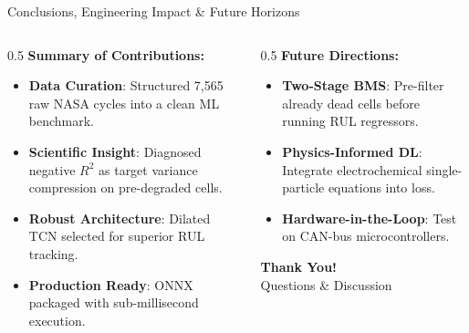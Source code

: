 \documentclass[aspectratio=169, 10pt]{beamer}
\begin{document}
\begin{frame}{Conclusions, Engineering Impact \& Future Horizons}
\begin{columns}[T]
    \begin{column}{0.5\textwidth}
        \textbf{Summary of Contributions:}
        \begin{itemize}
            \item \textbf{Data Curation}: Structured 7,565 raw NASA cycles into a clean ML benchmark.
            \item \textbf{Scientific Insight}: Diagnosed negative $R^2$ as target variance compression on pre-degraded cells.
            \item \textbf{Robust Architecture}: Dilated TCN selected for superior RUL tracking.
            \item \textbf{Production Ready}: ONNX packaged with sub-millisecond execution.
        \end{itemize}
    \end{column}
    \begin{column}{0.5\textwidth}
        \textbf{Future Directions:}
        \begin{itemize}
            \item \textbf{Two-Stage BMS}: Pre-filter already dead cells before running RUL regressors.
            \item \textbf{Physics-Informed DL}: Integrate electrochemical single-particle equations into loss.
            \item \textbf{Hardware-in-the-Loop}: Test on CAN-bus microcontrollers.
        \end{itemize}
        \vspace{0.4cm}
        \begin{center}
            \Large \textbf{Thank You!} \\
            \normalsize Questions \& Discussion
        \end{center}
    \end{column}
\end{columns}
\end{frame}
\end{document}
